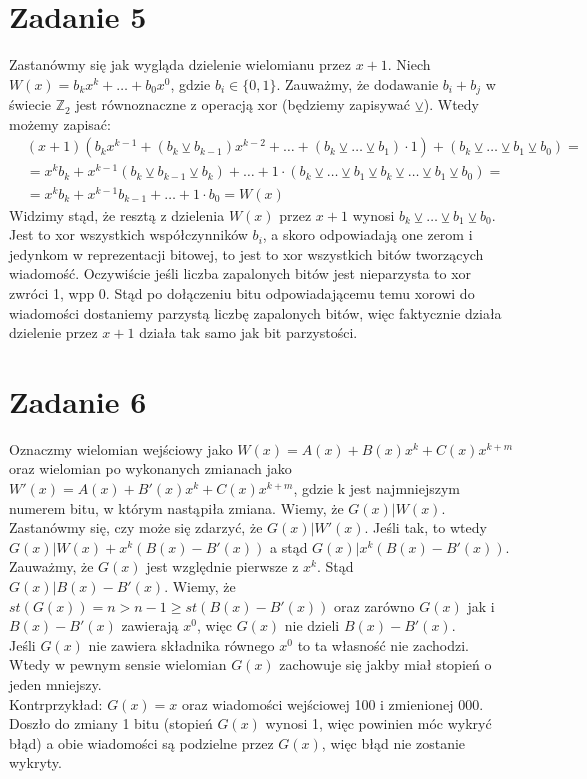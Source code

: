 \documentclass{article}
\begin{document}
\section{Zadanie 5}
Zastanówmy się jak wygląda dzielenie wielomianu przez $x+1$. Niech $W(x) = b_k x^k + \ldots + b_0 x^0$, gdzie $b_i \in \{0, 1\}$. Zauważmy, że dodawanie $b_i + b_j$ w świecie $\mathbb{Z}_2$ jest równoznaczne z operacją xor (będziemy zapisywać $\veebar$). Wtedy możemy zapisać:
\begin{align}
    &\left(x+1\right)\left(b_k x^{k-1} + (b_k \veebar b_{k-1})x^{k-2} + \ldots + (b_k \veebar \ldots \veebar b_1) \cdot 1\right) + (b_k \veebar \ldots \veebar b_1 \veebar b_0) = \\
    &= x^k b_k + x^{k-1} (b_k \veebar b_{k-1} \veebar b_k) + \ldots + 1 \cdot (b_k \veebar \ldots \veebar b_1 \veebar b_k \veebar \ldots \veebar b_1 \veebar b_0) =\\
    &= x^k b_k + x^{k-1} b_{k-1} + \ldots + 1 \cdot b_0 = W(x)
\end{align}
Widzimy stąd, że resztą z dzielenia $W(x)$ przez $x+1$ wynosi $b_k \veebar \ldots \veebar b_1 \veebar b_0$. Jest to xor wszystkich współczynników $b_i$, a skoro odpowiadają one zerom i jedynkom w reprezentacji bitowej, to jest to xor wszystkich bitów tworzących wiadomość. Oczywiście jeśli liczba zapalonych bitów jest nieparzysta to xor zwróci 1, wpp 0. Stąd po dołączeniu bitu odpowiadającemu temu xorowi do wiadomości dostaniemy parzystą liczbę zapalonych bitów, więc faktycznie działa dzielenie przez $x+1$ działa tak samo jak bit parzystości. 
\section{Zadanie 6}
Oznaczmy wielomian wejściowy jako $W(x) = A(x) + B(x)x^k + C(x) x^{k+m}$ oraz wielomian po wykonanych zmianach jako $W'(x) = A(x) + B'(x)x^k + C(x) x^{k+m}$, gdzie k jest najmniejszym numerem bitu, w którym nastąpiła zmiana. Wiemy, że $G(x) | W(x)$. Zastanówmy się, czy może się zdarzyć, że $G(x) | W'(x)$.
Jeśli tak, to wtedy $G(x) | W(x) + x^k (B(x) - B'(x))$ a stąd $G(x) | x^k(B(x) - B'(x))$. Zauważmy, że $G(x)$ jest względnie pierwsze z $x^k$. Stąd $G(x) | B(x) - B'(x)$. Wiemy, że $st(G(x)) = n > n-1 \geq st(B(x) - B'(x))$ oraz zarówno $G(x)$ jak i $B(x) - B'(x)$ zawierają $x^0$, więc $G(x)$ nie dzieli $B(x) - B'(x)$.\\
Jeśli $G(x)$ nie zawiera składnika równego $x^0$ to ta własność nie zachodzi. Wtedy w pewnym sensie wielomian $G(x)$ zachowuje się jakby miał stopień o jeden mniejszy. \\
Kontrprzykład: $G(x) = x$ oraz wiadomości wejściowej 100 i zmienionej 000. Doszło do zmiany 1 bitu (stopień $G(x)$ wynosi 1, więc powinien móc wykryć błąd) a obie wiadomości są podzielne przez $G(x)$, więc błąd nie zostanie wykryty.
\end{document}

